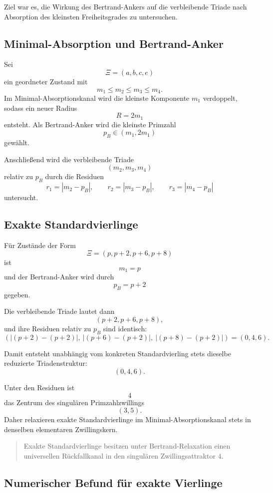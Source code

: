 \documentclass[11pt,a4paper]{article}
\theoremstyle{definition}
\theoremstyle{plain}
\theoremstyle{remark}
\begin{document}
	Ziel war es, die Wirkung des Bertrand-Ankers auf die verbleibende Triade nach Absorption des kleinsten Freiheitsgrades zu untersuchen.
	
	\subsection{Minimal-Absorption und Bertrand-Anker}
	
	Sei
	\[
	\Xi=(a,b,c,e)
	\]
	ein geordneter Zustand mit
	\[
	m_1 \le m_2 \le m_3 \le m_4.
	\]
	Im Minimal-Absorptionskanal wird die kleinste Komponente \(m_1\) verdoppelt, sodass ein neuer Radius
	\[
	R=2m_1
	\]
	entsteht. 
	Als Bertrand-Anker wird die kleinste Primzahl
	\[
	p_B \in (m_1,2m_1)
	\]
	gewählt.
	
	Anschließend wird die verbleibende Triade
	\[
	(m_2,m_3,m_4)
	\]
	relativ zu \(p_B\) durch die Residuen
	\[
	r_1=|m_2-p_B|,
	\qquad
	r_2=|m_3-p_B|,
	\qquad
	r_3=|m_4-p_B|
	\]
	untersucht.
	
	\subsection{Exakte Standardvierlinge}
	
	Für Zustände der Form
	\[
	\Xi=(p,p+2,p+6,p+8)
	\]
	ist
	\[
	m_1=p
	\]
	und der Bertrand-Anker wird durch
	\[
	p_B=p+2
	\]
	gegeben.
	
	Die verbleibende Triade lautet dann
	\[
	(p+2,p+6,p+8),
	\]
	und ihre Residuen relativ zu \(p_B\) sind identisch:
	\[
	(|(p+2)-(p+2)|,\ |(p+6)-(p+2)|,\ |(p+8)-(p+2)|)=(0,4,6).
	\]
	
	Damit entsteht unabhängig vom konkreten Standardvierling stets dieselbe reduzierte Triadenstruktur:
	\[
	(0,4,6).
	\]
	
	Unter den Residuen ist
	\[
	4
	\]
	das Zentrum des singulären Primzahlzwillings
	\[
	(3,5).
	\]
	Daher relaxieren exakte Standardvierlinge im Minimal-Absorptionskanal stets in denselben elementaren Zwillingskern.
	
	\begin{quote}
		Exakte Standardvierlinge besitzen unter Bertrand-Relaxation einen universellen Rückfallkanal in den singulären Zwillingsattraktor \(4\).
	\end{quote}
	
	\subsection{Numerischer Befund für exakte Vierlinge}
	
\end{document}
